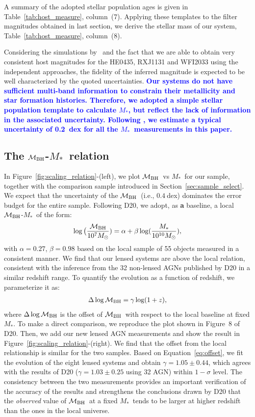\documentclass[fleqn,usenatbib]{mnras}
\newcommand{\mbh}{$\mathcal M_{\rm BH}$}
\newcommand{\mstar}{{$M_*$}}
\newcommand{\blue}[1]{{\bf \textcolor{blue}{#1}}}
\begin{document}
A summary of the adopted stellar population ages is given in Table~\ref{tab:host_measure}, column~(7). Applying these templates to the filter magnitudes obtained in last section, we derive the stellar mass of our system, Table~\ref{tab:host_measure}, column~(8).

Considering the simulations by~\citet{Ding2017a} and the fact that we are able to obtain very consistent host magnitudes for the HE0435, RXJ1131 and WFI2033 using the independent approaches, the fidelity of the inferred magnitude is expected to be well characterized by the quoted uncertainties.
\blue{
Our systems do not have sufficient multi-band information to constrain their metallicity and star formation histories. Therefore, we adopted a simple stellar population template to calculate \mstar, but reflect the lack of information in the associated uncertainty. Following \citet{Bell2001}, we estimate a typical uncertainty of 0.2~dex for all the \mstar\ measurements in this paper.}

\subsection{The \mbh-\mstar\ relation}\label{sec:relation}
In Figure~\ref{fig:scaling_relation}-(left), we plot \mbh\ vs \mstar\ for our sample, together with the comparison sample introduced in Section~\ref{sec:sample_select}.  We expect that the uncertainty of the \mbh\ (i.e., $0.4~$dex) dominates the error budget for the entire sample. Following D20, we adopt, as {\bf a} baseline, a local \mbh-\mstar\ of the form:
\begin{eqnarray}
\label{eq:MMlocal}
\log \big( \frac{\mathcal M_{\rm BH}}{10^{7}M_{\odot}})= \alpha + \beta \log(\frac{M_*}{10^{10}M_{\odot}}),
  \end {eqnarray}
with  $\alpha = 0.27$, $\beta = 0.98$ based on the local sample of 55 objects measured in a consistent manner. We find that our lensed systems are above the local relation, consistent with the inference from the 32  non-lensed AGNs published by D20 in a  similar redshift range. To quantify the evolution as a function of redshift, we parameterize it as:
\begin{eqnarray}
\label{eq:offset}
\Delta \log \mathcal M_{\rm BH}= \gamma \log (1 + z),
\end{eqnarray} 
where $\Delta \log \mathcal M_{\rm BH}$ is the offset of \mbh\ with respect to the local baseline at fixed \mstar. To make a direct comparison, we reproduce the plot shown in Figure~8 of D20. Then, we add our new lensed AGN measurements and show the result in Figure~\ref{fig:scaling_relation}-(right). We find that the offset from the local relationship is similar for the two samples. Based on Equation~\eqref{eq:offset}, we fit the evolution of the eight lensed systems and obtain $\gamma=1.05\pm0.44$, which agrees with the results of D20 ($\gamma=1.03\pm0.25$ using 32 AGN) within $1-\sigma$ level. The consistency between the two measurements provides an important verification of the accuracy of the results and strengthens the conclusions drawn by D20 that the {\it observed} value of \mbh\ at a fixed \mstar\ tends to be larger at higher redshift than the ones in the local universe.
\end{document}
